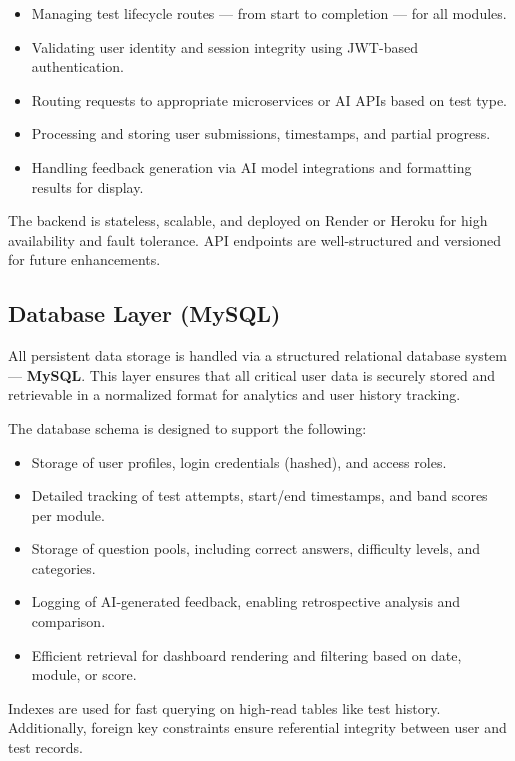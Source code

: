 \documentclass[a4paper,12pt]{article}
\begin{document}
\begin{itemize}
    \item Managing test lifecycle routes — from start to completion — for all modules.
    \item Validating user identity and session integrity using JWT-based authentication.
    \item Routing requests to appropriate microservices or AI APIs based on test type.
    \item Processing and storing user submissions, timestamps, and partial progress.
    \item Handling feedback generation via AI model integrations and formatting results for display.
\end{itemize}

The backend is stateless, scalable, and deployed on Render or Heroku for high availability and fault tolerance. API endpoints are well-structured and versioned for future enhancements.

\vspace{0.3cm}

\subsection{Database Layer (MySQL)}

All persistent data storage is handled via a structured relational database system — \textbf{MySQL}. This layer ensures that all critical user data is securely stored and retrievable in a normalized format for analytics and user history tracking.

The database schema is designed to support the following:

\begin{itemize}
    \item Storage of user profiles, login credentials (hashed), and access roles.
    \item Detailed tracking of test attempts, start/end timestamps, and band scores per module.
    \item Storage of question pools, including correct answers, difficulty levels, and categories.
    \item Logging of AI-generated feedback, enabling retrospective analysis and comparison.
    \item Efficient retrieval for dashboard rendering and filtering based on date, module, or score.
\end{itemize}

Indexes are used for fast querying on high-read tables like test history. Additionally, foreign key constraints ensure referential integrity between user and test records.
\end{document}
